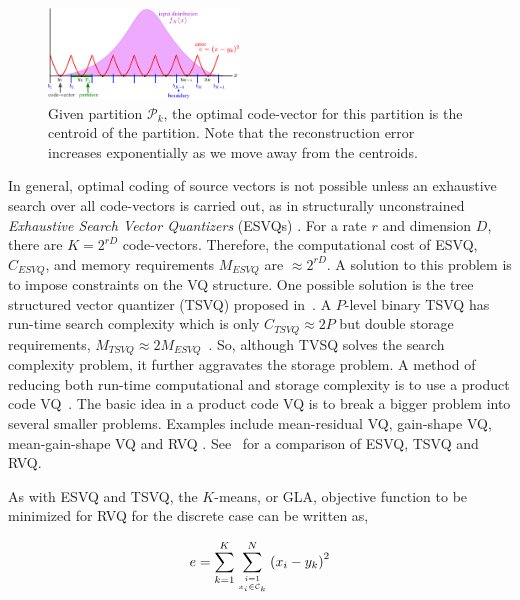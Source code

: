 \documentclass{article}
\begin{document}
\begin{figure}[h]			
\includegraphics[width=0.45\textwidth]{figs/quantization_scalar.pdf}
\caption{Given partition $\mathcal{P}_k$, the optimal code-vector for this partition is the centroid of the partition.  Note that the reconstruction error increases exponentially as we move away from the centroids.}
\label{fig:quantization_scalar}	
\end{figure}


In general, optimal coding of source vectors is not possible unless an exhaustive search over all code-vectors is carried out, as in structurally unconstrained \emph{Exhaustive Search Vector Quantizers} (ESVQs) \cite{1992_JNL_RVQ_Barnes}.  For a rate $r$ and dimension $D$, there are $K=2^{rD}$ code-vectors.  Therefore, the computational cost of ESVQ, $C_{ESVQ}$, and memory requirements $M_{ESVQ}$ are $\approx 2^{rD}$.  A solution to this problem is to impose constraints on the VQ structure.  One possible solution is the tree structured vector quantizer (TSVQ) proposed in~\cite{1980_JNL_TSVQ_Buzo}.  A $P$-level binary TSVQ has run-time search complexity which is only $C_{TSVQ} \approx 2P$ but double storage requirements, $M_{TSVQ} \approx 2 M_{ESVQ}$~\cite{1996_JNL_AdvancesRVQ_Barnes}.   So, although TVSQ solves the search complexity problem, it further aggravates the storage problem.  A method of reducing both run-time computational and storage complexity is to use a product code VQ~\cite{1991_BOOK_VQ_GershoGray}.  The basic idea in a product code VQ is to break a bigger problem into several smaller problems.  Examples include mean-residual VQ, gain-shape VQ, mean-gain-shape VQ and RVQ \cite{1996_JNL_AdvancesRVQ_Barnes}.  See~\cite{2011_THE_trkRVQ_Aslam} for a comparison of ESVQ, TSVQ and RVQ.

As with ESVQ and TSVQ, the $K$-means, or GLA, objective function to be minimized for RVQ for the discrete case can be written as,

\begin{equation}
e = \sum\limits_{k=1}^K \sum\limits_{{i=1 \atop x_i \in \mathcal{C}_k}}^N {(x_i - y_k)}^2
\label{eqn:RVQ_Kmeans_1}
\end{equation}																		
\end{document}
